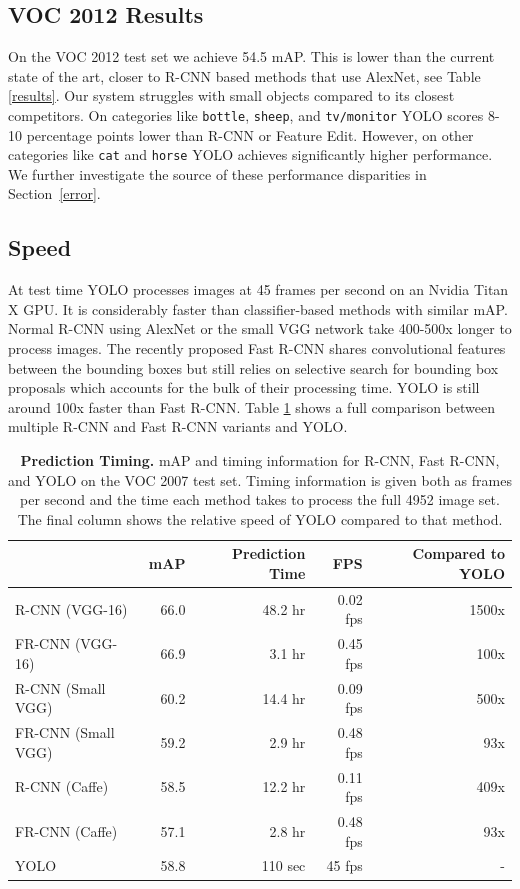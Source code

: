 \documentclass{article} %
\begin{document}
\subsection{VOC 2012 Results}

On the VOC 2012 test set we achieve 54.5 mAP. This is lower than the current state of the art, closer to R-CNN based methods that use AlexNet, see Table \ref{results}. Our system struggles with small objects compared to its closest competitors. On categories like \texttt{bottle}, \texttt{sheep}, and \texttt{tv/monitor} YOLO scores 8-10 percentage points lower than R-CNN or Feature Edit. However, on other categories like \texttt{cat} and \texttt{horse} YOLO achieves significantly higher performance. We further investigate the source of these performance disparities in Section~\ref{error}.

\subsection{Speed}

At test time YOLO processes images at 45 frames per second on an Nvidia Titan X GPU. It is considerably faster than classifier-based methods with similar mAP. Normal R-CNN using AlexNet or the small VGG network take 400-500x longer to process images. The recently proposed Fast R-CNN shares convolutional features between the bounding boxes but still relies on selective search for bounding box proposals which accounts for the bulk of their processing time. YOLO is still around 100x faster than Fast R-CNN. Table \ref{timing} shows a full comparison between multiple R-CNN and Fast R-CNN variants and YOLO.

\begin{table}[h]
\begin{center}
\begin{tabular}{lrrrr}
 & mAP & Prediction Time & FPS & Compared to YOLO\\
\hline
R-CNN (VGG-16) & 66.0 & 48.2 hr & 0.02 fps & 1500x \\
FR-CNN (VGG-16) & 66.9 & 3.1 hr & 0.45 fps & 100x \\
R-CNN (Small VGG) & 60.2 & 14.4 hr & 0.09 fps & 500x \\
FR-CNN (Small VGG) & 59.2 & 2.9 hr & 0.48 fps & 93x \\
R-CNN (Caffe) & 58.5 & 12.2 hr & 0.11 fps & 409x \\
FR-CNN (Caffe) & 57.1 & 2.8 hr & 0.48 fps & 93x \\
YOLO & 58.8 & 110 sec & 45 fps & - \\
\end{tabular}
\end{center}
\caption{\small \textbf{Prediction Timing.} mAP and timing information for R-CNN, Fast R-CNN, and YOLO on the VOC 2007 test set. Timing information is given both as frames per second and the time each method takes to process the full 4952 image set. The final column shows the relative speed of YOLO compared to that method.}
\label{timing}
\end{table}
\end{document}
